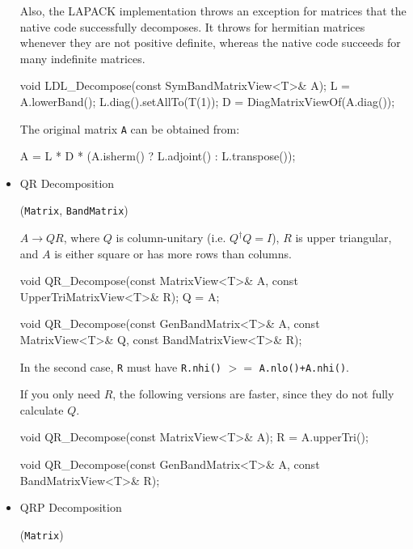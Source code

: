 \documentclass[twoside,letterpaper,11pt]{article}
\renewcommand{\tt}[1]{{\lstinline {#1}}}
\begin{document}
\begin{itemize}
{Also, the LAPACK implementation throws an exception for matrices that the native code
successfully decomposes.  It throws for hermitian matrices whenever they are 
not positive definite, whereas the native code succeeds for many indefinite matrices.
}

\begin{tmvcode}
void LDL_Decompose(const SymBandMatrixView<T>& A);
L = A.lowerBand();
L.diag().setAllTo(T(1));
D = DiagMatrixViewOf(A.diag());
\end{tmvcode}

The original matrix \tt{A} can be obtained from:
\begin{tmvcode}
A = L * D * (A.isherm() ? L.adjoint() : L.transpose());
\end{tmvcode}

\item QR Decomposition 

(\tt{Matrix}, \tt{BandMatrix})

$A \rightarrow Q R$, where $Q$ is column-unitary 
(i.e. $Q^\dagger Q = I$), $R$ is upper triangular, and $A$ is either square or 
has more rows than columns.

\begin{tmvcode}
void QR_Decompose(const MatrixView<T>& A, 
      const UpperTriMatrixView<T>& R);
Q = A;

void QR_Decompose(const GenBandMatrix<T>& A, 
      const MatrixView<T>& Q, const BandMatrixView<T>& R);
\end{tmvcode}
In the second case, \tt{R} must have \tt{R.nhi()} $>=$ \tt{A.nlo()+A.nhi()}.

If you only need $R$, the following versions are faster, since they do 
not fully calculate $Q$.
\begin{tmvcode}
void QR_Decompose(const MatrixView<T>& A);
R = A.upperTri();

void QR_Decompose(const GenBandMatrix<T>& A, 
      const BandMatrixView<T>& R);
\end{tmvcode}

\item QRP Decomposition 

(\tt{Matrix})


\end{itemize}
\end{document}

